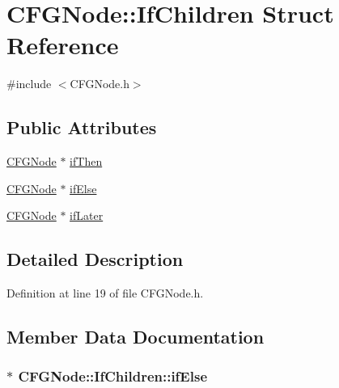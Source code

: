 \hypertarget{struct_c_f_g_node_1_1_if_children}{\section{C\-F\-G\-Node\-:\-:If\-Children Struct Reference}
\label{struct_c_f_g_node_1_1_if_children}
}


{\ttfamily \#include $<$C\-F\-G\-Node.\-h$>$}

\subsection*{Public Attributes}
\begin{DoxyCompactItemize}
\item 
\hyperlink{class_c_f_g_node}{C\-F\-G\-Node} $\ast$ \hyperlink{struct_c_f_g_node_1_1_if_children_a299931f6c58a86549f5f9e31be196474}{if\-Then}
\item 
\hyperlink{class_c_f_g_node}{C\-F\-G\-Node} $\ast$ \hyperlink{struct_c_f_g_node_1_1_if_children_adfda6cca2ffb3e7e6c3e5daeaca52021}{if\-Else}
\item 
\hyperlink{class_c_f_g_node}{C\-F\-G\-Node} $\ast$ \hyperlink{struct_c_f_g_node_1_1_if_children_a44ae8c2e40f67141a7821b22d9ea2d1c}{if\-Later}
\end{DoxyCompactItemize}


\subsection{Detailed Description}


Definition at line 19 of file C\-F\-G\-Node.\-h.



\subsection{Member Data Documentation}
\hypertarget{struct_c_f_g_node_1_1_if_children_adfda6cca2ffb3e7e6c3e5daeaca52021}{
\subsubsection[{if\-Else}]{$\ast$ C\-F\-G\-Node\-::\-If\-Children\-::if\-Else}}\label{struct_c_f_g_node_1_1_if_children_adfda6cca2ffb3e7e6c3e5daeaca52021}


